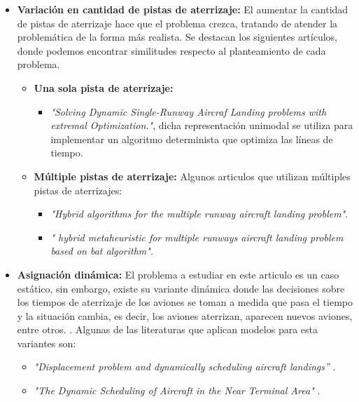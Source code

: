 \documentclass[letter, 10pt]{article}
\begin{document}
\begin{itemize}
    \item \textbf{Variación en cantidad de pistas de aterrizaje:} El aumentar la cantidad de pistas de aterrizaje hace que el problema crezca, tratando de atender la problemática de la forma más realista. Se destacan los siguientes artículos, donde podemos encontrar similitudes respecto al planteamiento de cada problema.
    \begin{itemize}
        \item \textbf{Una sola pista de aterrizaje:}
        \begin{itemize}
            \item \textit{"Solving Dynamic Single-Runway Aircraf Landing problems with extremal Optimization."}\cite{SingleRunway}, dicha representación unimodal se utiliza para implementar un algoritmo determinista que optimiza las líneas de tiempo.
        \end{itemize}
        
        \item \textbf{Múltiple pistas de aterrizaje:} Algunos articulos que utilizan múltiples pistas de aterrizajes:
        \begin{itemize}
            \item \textit{"Hybrid algorithms for the multiple runway aircraft landing problem"}\cite{HybridAyudante}.
            \item \textit{" hybrid metaheuristic for multiple runways aircraft landing problem based on bat algorithm"}\cite{multiRunway}.
        \end{itemize}  

    \end{itemize}
    \item \textbf{Asignación dinámica:} El problema a estudiar en este articulo es un caso estático, sin embargo, existe su variante dinámica donde las decisiones sobre los tiempos de aterrizaje de los aviones se toman a medida que pasa el tiempo y la situación cambia, es decir, los aviones aterrizan, aparecen nuevos aviones, entre otros. \cite{article1}. Algunas de las literaturas que aplican modelos para esta variantes son:
    \begin{itemize}
        \item \textit{"Displacement problem and dynamically scheduling aircraft landings”} \cite{BeasleyDinamic}.
        \item \textit{"The Dynamic Scheduling of Aircraft in the Near Terminal Area"} \cite{Dear1976}.
    \end{itemize}
   
\end{itemize}
\end{document}
